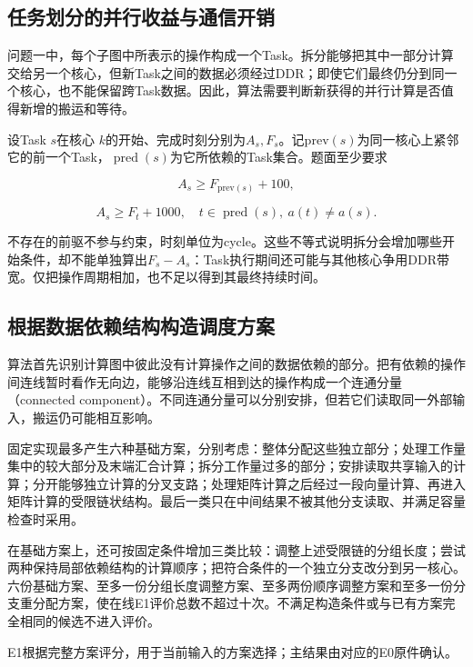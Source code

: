 \documentclass[anonymous,notoc]{gmcm2026}
\begin{document}
\subsection{任务划分的并行收益与通信开销}

问题一中，每个子图中所表示的操作构成一个Task。拆分能够把其中一部分计算交给另一个核心，但新Task之间的数据必须经过DDR；即使它们最终仍分到同一个核心，也不能保留跨Task数据。因此，算法需要判断新获得的并行计算是否值得新增的搬运和等待。

设Task \(s\)在核心 \(k\)的开始、完成时刻分别为\(A_s,F_s\)。记\(\mathrm{prev}(s)\)为同一核心上紧邻它的前一个Task，\(\operatorname{pred}(s)\)为它所依赖的Task集合。题面至少要求

\begin{equation}
A_s\ge F_{\mathrm{prev}(s)}+100,
\end{equation}

\begin{equation}
A_s\ge F_t+1000,\quad t\in\operatorname{pred}(s),\ a(t)\ne a(s).
\end{equation}

不存在的前驱不参与约束，时刻单位为cycle。这些不等式说明拆分会增加哪些开始条件，却不能单独算出\(F_s-A_s\)：Task执行期间还可能与其他核心争用DDR带宽。仅把操作周期相加，也不足以得到其最终持续时间。

\subsection{根据数据依赖结构构造调度方案}

算法首先识别计算图中彼此没有计算操作之间的数据依赖的部分。把有依赖的操作间连线暂时看作无向边，能够沿连线互相到达的操作构成一个连通分量（connected component）。不同连通分量可以分别安排，但若它们读取同一外部输入，搬运仍可能相互影响。

固定实现最多产生六种基础方案，分别考虑：整体分配这些独立部分；处理工作量集中的较大部分及末端汇合计算；拆分工作量过多的部分；安排读取共享输入的计算；分开能够独立计算的分叉支路；处理矩阵计算之后经过一段向量计算、再进入矩阵计算的受限链状结构。最后一类只在中间结果不被其他分支读取、并满足容量检查时采用。

在基础方案上，还可按固定条件增加三类比较：调整上述受限链的分组长度；尝试两种保持局部依赖结构的计算顺序；把符合条件的一个独立分支改分到另一核心。六份基础方案、至多一份分组长度调整方案、至多两份顺序调整方案和至多一份分支重分配方案，使在线E1评价总数不超过十次。不满足构造条件或与已有方案完全相同的候选不进入评价。

E1根据完整方案评分，用于当前输入的方案选择；主结果由对应的E0原件确认。
\end{document}
